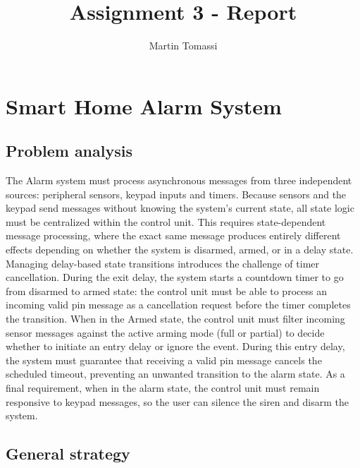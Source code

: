 \documentclass[11pt,a4paper]{article}
\title{\textbf{Assignment 3 - Report}}
\author{Martin Tomassi}
\date{}
\begin{document}
\maketitle

\section{Smart Home Alarm System}

\subsection{Problem analysis}

The Alarm system must process asynchronous messages from three independent sources: peripheral sensors, keypad inputs and timers. Because sensors and the keypad send messages without knowing the system’s current state, all state logic must be centralized within the control unit. This requires state-dependent message processing, where the exact same message produces entirely different effects depending on whether the system is disarmed, armed, or in a delay state. Managing delay-based state transitions introduces the challenge of timer cancellation. During the exit delay, the system starts a countdown timer to go from disarmed to armed state: the control unit must be able to process an incoming valid pin message as a cancellation request before the timer completes the transition. When in the Armed state, the control unit must filter incoming sensor messages against the active arming mode (full or partial) to decide whether to initiate an entry delay or ignore the event. During this entry delay, the system must guarantee that receiving a valid pin message cancels the scheduled timeout, preventing an unwanted transition to the alarm state. As a final requirement, when in the alarm state, the control unit must remain responsive to keypad messages, so the user can silence the siren and disarm the system.

\subsection{General strategy}
\end{document}
